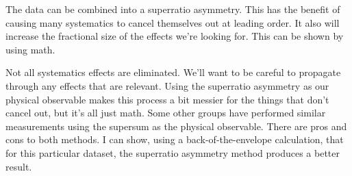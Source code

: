 The data can be combined into a superratio asymmetry.  This has the benefit of causing many systematics to cancel themselves out at leading order.  It also will increase the fractional size of the effects we're looking for.  This can be shown by using math.  

Not all systematics effects are eliminated.  We'll want to be careful to propagate through any effects that are relevant.  Using the superratio asymmetry as our physical observable makes this process a bit messier for the things that don't cancel out, but it's all just math.  
Some other groups have performed similar measurements using the supersum as the physical observable.  There are pros and cons to both methods.  I can show, using a back-of-the-envelope calculation, that for this particular dataset, the superratio asymmetry method produces a better result.  



